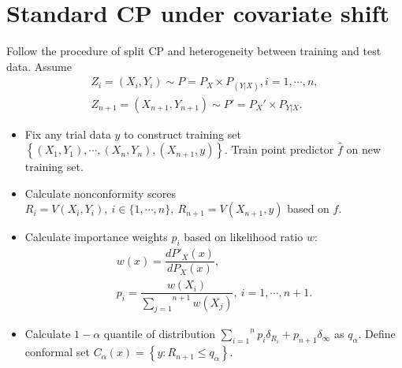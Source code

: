 \documentclass[12pt, a4paper, oneside]{article}
\begin{document}
\section{Standard CP under covariate shift}
    Follow the procedure of split CP and heterogeneity between training and test data\cite{tibshirani2019conformal}. Assume
    \begin{gather*}
        Z_i=(X_i,Y_i)\sim P=P_X\times P_(Y|X),i=1,\cdots,n,\\
        Z_{n+1}=(X_{n+1},Y_{n+1})\sim P'=P_X'\times P_{Y|X}.
    \end{gather*}
    \begin{itemize}
        \item Fix any trial data $y$ to construct training set $\left\{ (X_1,Y_1),\cdots,(X_n,Y_n),(X_{n+1},y) \right\}$. Train point predictor $\hat{f}$ on new training set.
        \item Calculate nonconformity scores $R_i=V(X_i,Y_i),\ i\in\{1,\cdots,n\},\ R_{n+1}=V(X_{n+1},y)$ based on $\hat{f}$.
        \item Calculate importance weights $p_i$ based on likelihood ratio $w$:
        \begin{gather*}
            w(x)=\dfrac{dP'_X(x)}{dP_X(x)},\\
            p_i=\dfrac{w(X_i)}{\overset{n+1}{\underset{j=1}\sum}w(X_j)},\ i=1,\cdots,n+1.
        \end{gather*}
        \item Calculate $1-\alpha$ quantile of distribution $\overset{n}{\underset{i=1}\sum}p_i\delta_{R_i}+p_{n+1}\delta_{\infty}$ as $q_\alpha$. Define conformal set $C_\alpha(x)=\left\{ y:R_{n+1}\leq q_\alpha \right\}$.
    \end{itemize}
\end{document}
